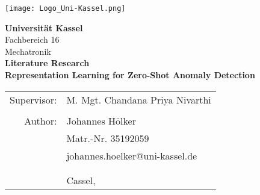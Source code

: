 \vspace{20pt}
\texttt{[image: Logo\_Uni-Kassel.png]}\vspace{50pt}
\begin{center}
\large\textbf{Universität Kassel}\\
Fachbereich 16\\
\large Mechatronik\\\vspace{50pt}
\Large\textbf{Literature Research}\\
\Large\textbf{Representation Learning for Zero-Shot Anomaly Detection}\\
\vspace{120pt}
\large
\begin{tabular}{rl}
Supervisor: & M. Mgt. Chandana Priya Nivarthi\\
  & \\
Author: & Johannes Hölker\\
 & Matr.-Nr. 35192059\\
 & johannes.hoelker@uni-kassel.de\\\vspace{40pt}
 & \\
 & \\
 & Cassel, \\
\end{tabular}
\end{center}
\thispagestyle{empty}
